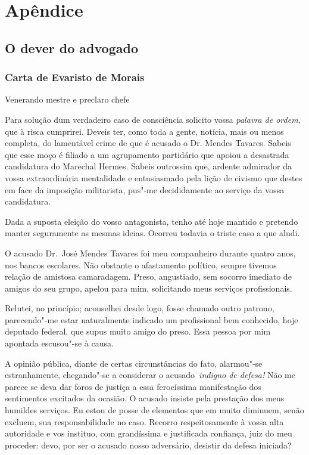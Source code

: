 \part{Apêndice}

\chapter{O dever do advogado}


\section{Carta de Evaristo de Morais}
\bigskip

\noindent Venerando mestre e preclaro chefe
\bigskip

Para solução dum verdadeiro caso de
consciência solicito vossa \textit{palavra de ordem}, que à risca
cumprirei. Deveis ter, como toda a gente, notícia, mais ou menos
completa, do lamentável crime de que é acusado o Dr. Mendes Tavares.
Sabeis que esse moço é filiado a um agrupamento partidário que apoiou a
desastrada candidatura do Marechal Hermes. Sabeis outrossim que,
ardente admirador da vossa extraordinária mentalidade e entusiasmado
pela lição de civismo que destes em face da imposição militarista,
pus"-me decididamente ao serviço da vossa candidatura. 

Dada a suposta eleição do vosso antagonista, tenho até hoje mantido e pretendo manter
seguramente as mesmas ideias. Ocorreu todavia o triste caso a que aludi. 

O acusado Dr.~José Mendes Tavares foi meu companheiro durante
quatro anos, nos bancos escolares. Não obstante o afastamento
político, sempre tivemos relação de amistosa camaradagem. Preso,
angustiado, sem socorro imediato de amigos do seu grupo, apelou para
mim, solicitando meus serviços profissionais. 

Relutei, no princípio;
aconselhei desde logo, fosse chamado outro patrono, parecendo"-me
estar naturalmente indicado um profissional bem conhecido, hoje
deputado federal, que supus muito amigo do preso. Essa pessoa por mim
apontada escusou"-se à causa. 

A opinião pública, diante de certas
circunstâncias do fato, alarmou"-se estranhamente, chegando"-se a
considerar o acusado \textit{indigno de defesa!} Não me
parece se deva dar foros de justiça a essa ferocíssima manifestação dos
sentimentos excitados da ocasião. O acusado insiste pela prestação dos
meus humildes serviços. Eu estou de posse de elementos que em muito
diminuem, senão excluem, sua responsabilidade no caso. Recorro
respeitosamente à vossa alta autoridade e vos instituo, com
grandíssima e justificada confiança, juiz do meu proceder: devo, por
ser o acusado nosso adversário, desistir da defesa iniciada?

